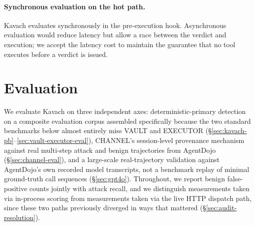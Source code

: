 \documentclass[sigconf,anonymous,review]{acmart}
\begin{document}
\paragraph{Synchronous evaluation on the hot path.} Kavach evaluates
synchronously in the pre-execution hook. Asynchronous evaluation would
reduce latency but allow a race between the verdict and execution; we accept
the latency cost to maintain the guarantee that no tool executes before a
verdict is issued.




\section{Evaluation}
\label{sec:eval}

We evaluate Kavach on three independent axes: deterministic-primary
detection on a composite evaluation corpus assembled specifically because
the two standard benchmarks below almost entirely miss VAULT and EXECUTOR
(\S\ref{sec:kavach-pb}--\ref{sec:vault-executor-eval}), CHANNEL's
session-level provenance mechanism against real multi-step attack and
benign trajectories from AgentDojo (\S\ref{sec:channel-eval}), and a
large-scale real-trajectory validation against AgentDojo's own recorded
model transcripts, not a benchmark replay of minimal ground-truth call
sequences (\S\ref{sec:gpt4o}). Throughout, we report benign false-positive
counts jointly with attack recall, and we distinguish measurements taken
via in-process scoring from measurements taken via the live HTTP dispatch
path, since these two paths previously diverged in ways that mattered
(\S\ref{sec:audit-resolution}).
\end{document}
